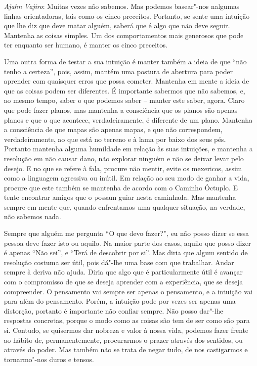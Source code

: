 \emph{Ajahn Vajiro}: Muitas vezes não sabemos. Mas podemos basear"-nos nalgumas
linhas orientadoras, tais como os cinco preceitos. Portanto, se sente uma
intuição que lhe diz que deve matar alguém, saberá que é algo que não deve
seguir. Mantenha as coisas simples. Um dos comportamentos mais generosos que
pode ter enquanto ser humano, é manter os cinco preceitos.

Uma outra forma de testar a sua intuição é manter também a ideia de que ``não
tenho a certeza'', pois, assim, mantém uma postura de abertura para poder
aprender com quaisquer erros que possa cometer. Mantenha em mente a ideia de que
as coisas podem ser diferentes. É importante sabermos que não sabemos, e, ao
mesmo tempo, saber o que podemos saber -- manter este saber, agora. Claro que
pode fazer planos, mas mantenha a consciência que os planos são apenas planos e
que o que acontece, verdadeiramente, é diferente de um plano. Mantenha a
consciência de que mapas são apenas mapas, e que não correspondem,
verdadeiramente, ao que está no terreno e à lama por baixo dos seus pés.
Portanto mantenha alguma humildade em relação às suas intuições, e mantenha a
resolução em não causar dano, não explorar ninguém e não se deixar levar pelo
desejo. E no que se refere à fala, procure não mentir, evite os mexericos, assim
como a linguagem agressiva ou inútil. Em relação ao seu modo de ganhar a vida,
procure que este também se mantenha de acordo com o Caminho Óctuplo. E tente
encontrar amigos que o possam guiar nesta caminhada. Mas mantenha sempre em
mente que, quando enfrentamos uma qualquer situação, na verdade, não sabemos
nada.

Sempre que alguém me pergunta ``O que devo fazer?'', eu não posso dizer se essa
pessoa deve fazer isto ou aquilo. Na maior parte dos casos, aquilo que posso
dizer é apenas ``Não sei'', e ``Terá de descobrir por si''. Mas diria que algum
sentido de resolução costuma ser útil, pois dá"-lhe uma base com que trabalhar.
Andar sempre à deriva não ajuda. Diria que algo que é particularmente útil é
avançar com o compromisso de que se deseja aprender com a experiência, que se
deseja compreender. O pensamento vai sempre ser apenas o pensamento, e a
intuição vai para além do pensamento. Porém, a intuição pode por vezes ser
apenas uma distorção, portanto é importante não confiar sempre. Não posso
dar"-lhe respostas concretas, porque o modo como as coisas são tem de ser como
são para si. Contudo, se quisermos dar nobreza e valor à nossa vida, podemos
fazer frente ao hábito de, permanentemente, procurarmos o prazer através dos
sentidos, ou através do poder. Mas também não se trata de negar tudo, de nos
castigarmos e tornarmo"-nos duros e tensos.

